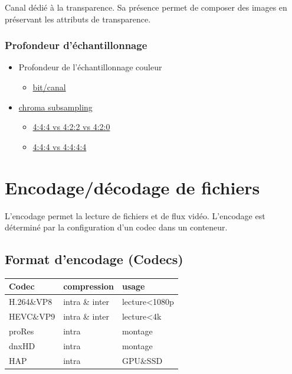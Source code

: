 \documentclass[
  french,
]{book}
\providecommand{\tightlist}{%
  \setlength{\itemsep}{0pt}\setlength{\parskip}{0pt}}
\begin{document}
Canal dédié à la transparence.
Sa présence permet de composer des images en préservant les attributs de transparence.

\hypertarget{profondeur-duxe9chantillonnage}{%
\subsubsection{Profondeur d'échantillonnage}\label{profondeur-duxe9chantillonnage}}

\begin{itemize}
\tightlist
\item
  Profondeur de l'échantillonnage couleur

  \begin{itemize}
  \tightlist
  \item
    \href{https://en.wikipedia.org/wiki/Color_depth}{bit/canal}\\
  \end{itemize}
\item
  \href{https://en.wikipedia.org/wiki/Chroma_subsampling\#Sampling_systems_and_ratios}{chroma subsampling}

  \begin{itemize}
  \tightlist
  \item
    \href{https://upload.wikimedia.org/wikipedia/commons/0/06/Colorcomp.jpg}{4:4:4 vs 4:2:2 vs 4:2:0}
  \item
    \href{https://en.wikipedia.org/wiki/Alpha_compositing}{4:4:4 vs 4:4:4:4}
  \end{itemize}
\end{itemize}

\hypertarget{lexique_fichiers}{%
\section{Encodage/décodage de fichiers}\label{lexique_fichiers}}

L'encodage permet la lecture de fichiers et de flux vidéo.
L'encodage est déterminé par la configuration d'un codec dans un conteneur.

\hypertarget{format-dencodage-codecs}{%
\subsection{Format d'encodage (Codecs)}\label{format-dencodage-codecs}}

\begin{longtable}[]{@{}lll@{}}
\toprule
Codec & compression & usage \\
\midrule
\endhead
H.264\&VP8 & intra \& inter & lecture\textless1080p \\
HEVC\&VP9 & intra \& inter & lecture\textless4k \\
proRes & intra & montage \\
dnxHD & intra & montage \\
HAP & intra & GPU\&SSD \\
\bottomrule
\end{longtable}
\end{document}
